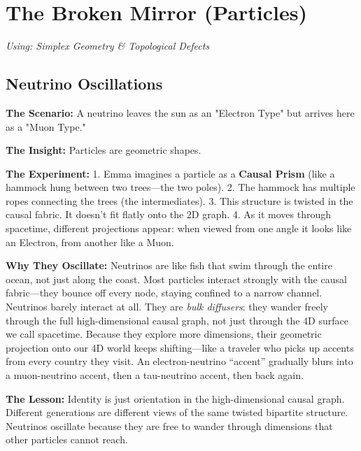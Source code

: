 \documentclass[11pt, a4paper, openany]{book}
\begin{document}
\chapter{The Broken Mirror (Particles)}
\textit{Using: Simplex Geometry \& Topological Defects}

\section{Neutrino Oscillations}
\begin{thoughtexp}
\textbf{The Scenario:} A neutrino leaves the sun as an "Electron Type" but arrives here as a "Muon Type."

\textbf{The Insight:} Particles are geometric shapes.

\textbf{The Experiment:}
1. Emma imagines a particle as a \textbf{Causal Prism} (like a hammock hung between two trees---the two poles).
2. The hammock has multiple ropes connecting the trees (the intermediates).
3. This structure is twisted in the causal fabric. It doesn't fit flatly onto the 2D graph.
4. As it moves through spacetime, different projections appear: when viewed from one angle it looks like an Electron, from another like a Muon.

\textbf{Why They Oscillate:} Neutrinos are like fish that swim through the entire ocean, not just along the coast. Most particles interact strongly with the causal fabric---they bounce off every node, staying confined to a narrow channel. Neutrinos barely interact at all. They are \emph{bulk diffusers}: they wander freely through the full high-dimensional causal graph, not just through the 4D surface we call spacetime. Because they explore more dimensions, their geometric projection onto our 4D world keeps shifting---like a traveler who picks up accents from every country they visit. An electron-neutrino ``accent'' gradually blurs into a muon-neutrino accent, then a tau-neutrino accent, then back again.

\textbf{The Lesson:} Identity is just orientation in the high-dimensional causal graph. Different generations are different views of the same twisted bipartite structure. Neutrinos oscillate because they are free to wander through dimensions that other particles cannot reach.
\end{thoughtexp}
\end{document}
